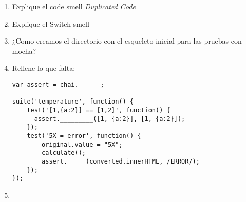 \documentclass[spanish,a4paper,11pt]{article}
\begin{document}
\begin{enumerate}
\item  Explique el code smell {\it Duplicated Code}
\item  Explique el Switch smell


\item 
¿Como creamos el directorio con el esqueleto inicial para las pruebas con mocha?
\item Rellene lo que falta:
\begin{verbatim}
var assert = chai.______;

suite('temperature', function() {
    test('[1,{a:2}] == [1,2]', function() {
      assert._________([1, {a:2}], [1, {a:2}]);
    });
    test('5X = error', function() {
        original.value = "5X";
        calculate();
        assert._____(converted.innerHTML, /ERROR/);
    });
});
\end{verbatim}
\item 
\end{enumerate}
\end{document}
